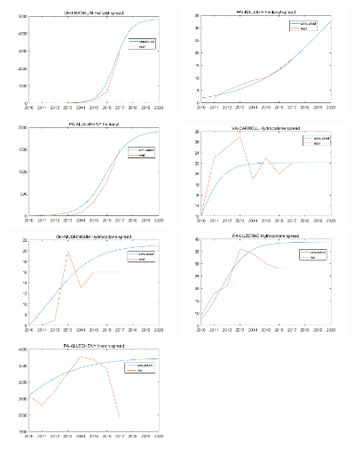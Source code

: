 \documentclass[12pt]{article}
\begin{document}
\begin{figure}[!htbp]
\small
\centering
\includegraphics[width=5cm]{Fig/f1}
\includegraphics[width=5cm]{Fig/f2}
\includegraphics[width=5cm]{Fig/f3}
\includegraphics[width=5cm]{Fig/o1}
\includegraphics[width=5cm]{Fig/o2}
\includegraphics[width=5cm]{Fig/o3}
\includegraphics[width=5cm]{Fig/h1}

\end{figure}
\end{document}
